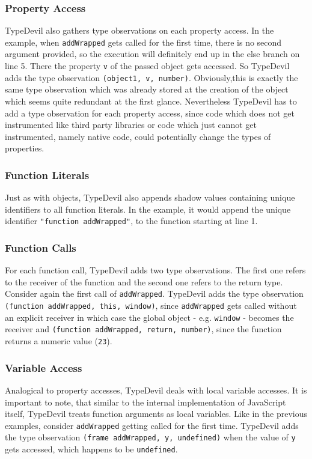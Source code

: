 \documentclass[runningheads,a4paper]{llncs}
\begin{document}
\subsubsection{Property Access}
TypeDevil also gathers type observations on each property access.
In the example, when \lstinline[columns=fixed]{addWrapped} gets called for the first time, there is no second argument provided, so the execution will definitely end up in the else branch on line 5. 
There the property \lstinline[columns=fixed]{v} of the passed object gets accessed.
So TypeDevil adds the type observation \lstinline[columns=fixed]{(object1, v, number)}.
Obviously,this is exactly the same type observation which was already stored at the creation of the object which seems quite redundant at the first glance. 
Nevertheless TypeDevil has to add a type observation for each property access, since code which does not get instrumented like third party libraries or code which just cannot get instrumented, namely native code, could potentially change the types of properties.

\subsubsection{Function Literals}
Just as with objects, TypeDevil also appends shadow values containing unique identifiers to all function literals.
In the example, it would append the unique identifier \lstinline[columns=fixed]{"function addWrapped"}, to the function starting at line 1.

\subsubsection{Function Calls}
For each function call, TypeDevil adds two type observations.
The first one refers to the receiver of the function and the second one refers to the return type.
Consider again the first call of \lstinline[columns=fixed]{addWrapped}.
TypeDevil adds the type observation \lstinline[columns=fixed]{(function addWrapped, this, window)}, since \lstinline[columns=fixed]{addWrapped} gets called without an explicit receiver in which case the global object - e.g. \lstinline[columns=fixed]{window} - becomes the receiver
and \lstinline[columns=fixed]{(function addWrapped, return, number)}, since the function returns a numeric value (\lstinline[columns=fixed]{23}).

\subsubsection{Variable Access}
Analogical to property accesses, TypeDevil deals with local variable accesses.
It is important to note, that similar to the internal implementation of JavaScript itself, TypeDevil treats function arguments as local variables.
Like in the previous examples, consider \lstinline[columns=fixed]{addWrapped} getting called for the first time.
TypeDevil adds the type observation \lstinline[columns=fixed]{(frame addWrapped, y, undefined)} when the value of \lstinline[columns=fixed]{y} gets accessed, which happens to be \lstinline[columns=fixed]{undefined}.
\end{document}
